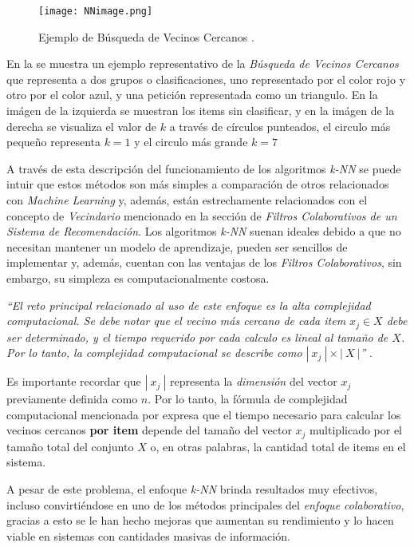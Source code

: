 \begin{figure}[h!]
    \centering
    \texttt{[image: NNimage.png]}
    \caption{Ejemplo de Búsqueda de Vecinos Cercanos \parencite{10.5555/1941884}.}
    \label{fig:NNEjemplo}
\end{figure}

En la  se muestra un ejemplo representativo de la \textit{Búsqueda de Vecinos Cercanos} que representa a dos grupos o clasificaciones, uno representado por el color rojo y otro por el color azul, y una petición representada como un triangulo. En la imágen de la izquierda se muestran los items sin clasificar, y en la imágen de la derecha se visualiza el valor de $k$ a través de círculos punteados, el circulo más pequeño representa $k = 1$ y el circulo más grande $k = 7$ 

\newpage

A través de esta descripción del funcionamiento de los algoritmos \textit{k-NN} se puede intuir que estos métodos son más simples a comparación de otros relacionados con \textit{Machine Learning} y, además, están estrechamente relacionados con el concepto de \textit{Vecindario} mencionado en la sección de \textit{Filtros Colaborativos de un Sistema de Recomendación}. Los algoritmos \textit{k-NN} suenan ideales debido a que no necesitan mantener un modelo de aprendizaje, pueden ser sencillos de implementar y, además, cuentan con las ventajas de los \textit{Filtros Colaborativos}, sin embargo, su simpleza es computacionalmente costosa.

\textit{``El reto principal relacionado al uso de este enfoque es la alta complejidad computacional. Se debe notar que el vecino más cercano de cada item $x_j \in X$ debe ser determinado, y el tiempo requerido por cada calculo es lineal al tamaño de $X$. Por lo tanto, la complejidad computacional se describe como $|\ x_j \ | \times | \ X  \ |$''} \parencite{Aggarwal2016}.

Es importante recordar que $| \ x_j \ |$ representa la \textit{dimensión} del vector $x_j$ previamente definida como $n$. Por lo tanto, la fórmula de complejidad computacional mencionada por \parencite{Aggarwal2016} expresa que el tiempo necesario para calcular los vecinos cercanos \textbf{por item} depende del tamaño del vector $x_j$ multiplicado por el tamaño total del conjunto $X$ o, en otras palabras, la cantidad total de items en el sistema. 

A pesar de este problema, el enfoque \textit{k-NN} brinda resultados muy efectivos, incluso convirtiéndose en uno de los métodos principales del \textit{enfoque colaborativo}, gracias a esto se le han hecho mejoras que aumentan su rendimiento y lo hacen viable en sistemas con cantidades masivas de información.